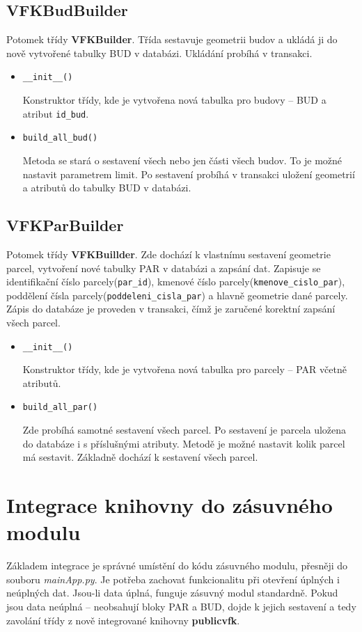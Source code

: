 \subsection{VFKBudBuilder}
Potomek třídy \textbf{VFKBuilder}. Třída sestavuje geometrii budov a ukládá ji do nově vytvořené tabulky BUD v databázi. Ukládání probíhá v transakci.
\begin{itemize}[leftmargin=50pt]
\item \verb|__init__()|

Konstruktor třídy, kde je vytvořena nová tabulka pro budovy -- BUD a atribut \verb|id_bud|.
\item \verb|build_all_bud()|

Metoda se stará o sestavení všech nebo jen části všech budov. To je možné nastavit parametrem limit. Po sestavení probíhá v transakci uložení geometrií a atributů do tabulky BUD v databázi.
\end{itemize}
\subsection{VFKParBuilder}
Potomek třídy \textbf{VFKBuillder}. Zde dochází k vlastnímu sestavení geometrie parcel, vytvoření nové tabulky PAR v databázi a zapsání dat. Zapisuje se identifikační číslo parcely(\verb|par_id|), kmenové číslo parcely(\verb|kmenove_cislo_par|), poddělení čísla parcely(\verb|poddeleni_cisla_par|) a hlavně geometrie dané parcely. Zápis do databáze je proveden v transakci, čímž je zaručené korektní zapsání všech parcel.

\begin{itemize}[leftmargin=50pt]
\item \verb|__init__()|

Konstruktor třídy, kde je vytvořena nová tabulka pro parcely -- PAR včetně atributů.
\item \verb|build_all_par()|

Zde probíhá samotné sestavení všech parcel. Po sestavení je parcela uložena do databáze i s příslušnými atributy. Metodě je možné nastavit kolik parcel má sestavit. Základně dochází k sestavení všech parcel.

\end{itemize}
\section{Integrace knihovny do zásuvného modulu}
\label{sec:integrace_knihovny}
Základem integrace je správné umístění do kódu zásuvného modulu, přesněji do souboru \textit{mainApp.py}. Je potřeba zachovat funkcionalitu při otevření úplných i neúplných dat. Jsou-li data úplná, funguje zásuvný modul standardně. Pokud jsou data neúplná  -- neobsahují bloky PAR a BUD, dojde k jejich sestavení a tedy zavolání třídy z nově integrované knihovny \textbf{publicvfk}.

